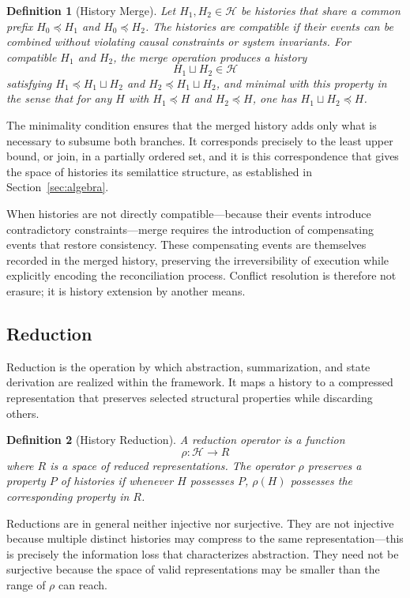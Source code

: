 \documentclass[12pt]{article}
\newtheorem{definition}{Definition}
\begin{document}
\begin{definition}[History Merge]
Let $H_1, H_2 \in \mathcal{H}$ be histories that share a common prefix $H_0 \preceq H_1$ and $H_0 \preceq H_2$. The histories are \emph{compatible} if their events can be combined without violating causal constraints or system invariants. For compatible $H_1$ and $H_2$, the \emph{merge operation} produces a history
\[
H_1 \sqcup H_2 \in \mathcal{H}
\]
satisfying $H_1 \preceq H_1 \sqcup H_2$ and $H_2 \preceq H_1 \sqcup H_2$, and minimal with this property in the sense that for any $H$ with $H_1 \preceq H$ and $H_2 \preceq H$, one has $H_1 \sqcup H_2 \preceq H$.
\end{definition}

The minimality condition ensures that the merged history adds only what is necessary to subsume both branches. It corresponds precisely to the least upper bound, or join, in a partially ordered set, and it is this correspondence that gives the space of histories its semilattice structure, as established in Section~\ref{sec:algebra}.

When histories are not directly compatible---because their events introduce contradictory constraints---merge requires the introduction of compensating events that restore consistency. These compensating events are themselves recorded in the merged history, preserving the irreversibility of execution while explicitly encoding the reconciliation process. Conflict resolution is therefore not erasure; it is history extension by another means.

\subsection{Reduction}

Reduction is the operation by which abstraction, summarization, and state derivation are realized within the framework. It maps a history to a compressed representation that preserves selected structural properties while discarding others.

\begin{definition}[History Reduction]
A \emph{reduction operator} is a function
\[
\rho : \mathcal{H} \rightarrow R
\]
where $R$ is a space of reduced representations. The operator $\rho$ \emph{preserves} a property $P$ of histories if whenever $H$ possesses $P$, $\rho(H)$ possesses the corresponding property in $R$.
\end{definition}

Reductions are in general neither injective nor surjective. They are not injective because multiple distinct histories may compress to the same representation---this is precisely the information loss that characterizes abstraction. They need not be surjective because the space of valid representations may be smaller than the range of $\rho$ can reach.
\end{document}
